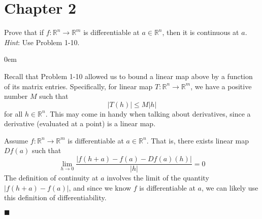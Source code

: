 \documentclass[12pt]{article}
\renewcommand{\qed}{\hfill$\blacksquare$}
\renewenvironment{proof}{\begin{addmargin}[1em]{0em}\begin{newproof}}{\end{newproof}\end{addmargin}\qed}
\newenvironment{problem}[2][Problem]{\begin{trivlist}
\item[\hskip \labelsep {\bfseries #1}\hskip \labelsep {\bfseries #2.}]}{\end{trivlist}}
\begin{document}
 
 
 
 
 
 
 
 
 
 
 
 
 \newpage
\section*{Chapter 2}

\begin{problem}{2.1}
Prove that if $f:\mathbb{R}^n \rightarrow \mathbb{R}^m$ is differentiable at $a\in \mathbb{R}^n$, then it is continuous at $a$. \textit{Hint}: Use Problem 1-10.
\end{problem}

\begin{proof}
Recall that Problem 1-10 allowed us to bound a linear map above by a function of its matrix entries. Specifically, for linear map $T: \mathbb{R}^n \rightarrow \mathbb{R}^m$, we have a positive number $M$ such that
$$ \left|T\left(h\right)\right| \leq M \left| h\right| $$
for all $h \in \mathbb{R}^n$. This may come in handy when talking about derivatives, since a derivative (evaluated at a point) is a linear map.

Assume $f:\mathbb{R}^n\rightarrow \mathbb{R}^m$ is differentiable at $a\in \mathbb{R}^n$. That is, there exists linear map $Df\left(a\right)$ such that 
$$ \lim_{h\rightarrow 0} \frac{\left|f\left(h+a\right)-f\left(a\right) - Df\left(a\right) \left(h\right)\right|}{\left|h\right|}=0 $$ The definition of continuity at $a$ involves the limit of the quantity $ \left| f\left(h+a\right) - f\left(a\right)\right|$, and since we know $f$ is differentiable at $a$, we can likely use this definition of differentiability. 


\end{proof}
\end{document}
